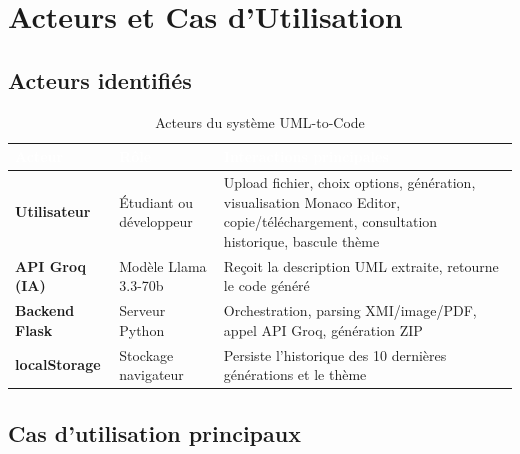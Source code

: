 \documentclass[12pt,a4paper]{article}
\begin{document}
\clearpage
\section{Acteurs et Cas d'Utilisation}

\subsection{Acteurs identifiés}

\begin{table}[H]
\centering
\renewcommand{\arraystretch}{1.3}
\begin{tabularx}{\textwidth}{|l|l|X|}
\hline
\rowcolor{darkblue!90}
\textcolor{white}{\textbf{Acteur}} &
\textcolor{white}{\textbf{Rôle}} &
\textcolor{white}{\textbf{Interactions principales}} \\
\hline
\textbf{Utilisateur} & Étudiant ou développeur & Upload fichier, choix options, génération, visualisation Monaco Editor, copie/téléchargement, consultation historique, bascule thème \\
\hline
\rowcolor{lightgray}
\textbf{API Groq (IA)} & Modèle Llama 3.3-70b & Reçoit la description UML extraite, retourne le code généré \\
\hline
\textbf{Backend Flask} & Serveur Python & Orchestration, parsing XMI/image/PDF, appel API Groq, génération ZIP \\
\hline
\rowcolor{lightgray}
\textbf{localStorage} & Stockage navigateur & Persiste l'historique des 10 dernières générations et le thème \\
\hline
\end{tabularx}
\caption{Acteurs du système UML-to-Code}
\end{table}

\subsection{Cas d'utilisation principaux}
\end{document}
